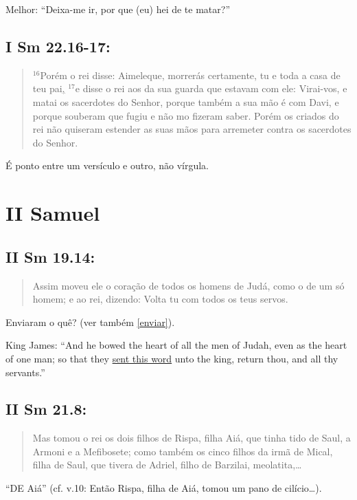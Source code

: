 Melhor: ``Deixa-me ir, por que (eu) hei de te matar?''

\subsection{I Sm 22.16-17:}
\begin{quote}
    \small
$^{\mathrm{16}}$Porém o rei disse: Aimeleque, morrerás certamente, tu e toda a casa de teu pai\uline{,} $^{\mathrm{17}}$e disse o rei aos da sua guarda que estavam com ele: Virai-vos, e matai os sacerdotes do Senhor, porque também a sua mão é com Davi, e porque souberam que fugiu e não mo fizeram saber. Porém os criados do rei não quiseram estender as suas mãos para arremeter contra os sacerdotes do Senhor.
\end{quote}

É ponto entre um versículo e outro, não vírgula.

\section{II Samuel}
\subsection{II Sm 19.14:}
\begin{quote}
    \small
Assim moveu ele o coração de todos os homens de Judá, como o de um só homem; e  ao rei, dizendo: Volta tu com todos os teus servos.
\end{quote}

Enviaram o quê? (ver também \ref{enviar}).

King James: ``And he bowed the heart of all the men of Judah, even as the heart of one man; so that they \uline{sent this word} unto the king, return thou, and all thy servants.''

\subsection{II Sm 21.8:}
\begin{quote}
    \small
Mas tomou o rei os dois filhos de Rispa, filha  Aiá, que tinha tido de Saul, a Armoni e a Mefibosete; como também os cinco filhos da irmã de Mical, filha de Saul, que tivera de Adriel, filho de Barzilai, meolatita,\ldots
\end{quote}

``DE Aiá'' (cf. v.10: Então Rispa, filha de Aiá, tomou um pano de cilício\ldots).


